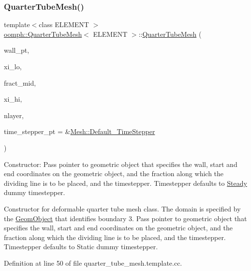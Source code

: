 \subsubsection{\texorpdfstring{Quarter\+Tube\+Mesh()}{QuarterTubeMesh()}}
{\footnotesize\ttfamily template$<$class E\+L\+E\+M\+E\+NT $>$ \\
\hyperlink{classoomph_1_1QuarterTubeMesh}{oomph\+::\+Quarter\+Tube\+Mesh}$<$ E\+L\+E\+M\+E\+NT $>$\+::\hyperlink{classoomph_1_1QuarterTubeMesh}{Quarter\+Tube\+Mesh} (\begin{DoxyParamCaption}\item[{\hyperlink{classoomph_1_1GeomObject}{Geom\+Object} $\ast$}]{wall\+\_\+pt,  }\item[{const \hyperlink{classoomph_1_1Vector}{Vector}$<$ double $>$ \&}]{xi\+\_\+lo,  }\item[{const double \&}]{fract\+\_\+mid,  }\item[{const \hyperlink{classoomph_1_1Vector}{Vector}$<$ double $>$ \&}]{xi\+\_\+hi,  }\item[{const unsigned \&}]{nlayer,  }\item[{\hyperlink{classoomph_1_1TimeStepper}{Time\+Stepper} $\ast$}]{time\+\_\+stepper\+\_\+pt = {\ttfamily \&\hyperlink{classoomph_1_1Mesh_a12243d0fee2b1fcee729ee5a4777ea10}{Mesh\+::\+Default\+\_\+\+Time\+Stepper}} }\end{DoxyParamCaption})}



Constructor\+: Pass pointer to geometric object that specifies the wall, start and end coordinates on the geometric object, and the fraction along which the dividing line is to be placed, and the timestepper. Timestepper defaults to \hyperlink{classoomph_1_1Steady}{Steady} dummy timestepper. 

Constructor for deformable quarter tube mesh class. The domain is specified by the \hyperlink{classoomph_1_1GeomObject}{Geom\+Object} that identifies boundary 3. Pass pointer to geometric object that specifies the wall, start and end coordinates on the geometric object, and the fraction along which the dividing line is to be placed, and the timestepper. Timestepper defaults to Static dummy timestepper. 

Definition at line 50 of file quarter\+\_\+tube\+\_\+mesh.\+template.\+cc.



